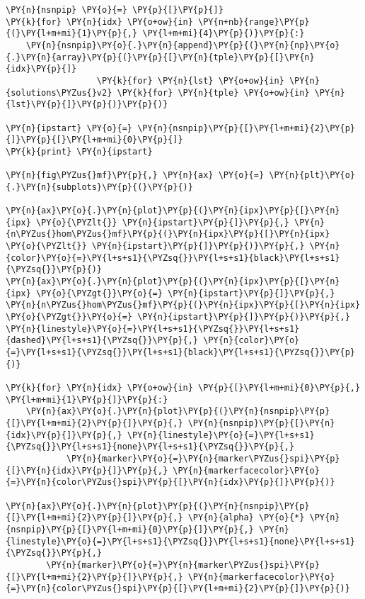 \begin{Verbatim}[commandchars=\\\{\}]
\PY{n}{nsnpip} \PY{o}{=} \PY{p}{[}\PY{p}{]}
\PY{k}{for} \PY{n}{idx} \PY{o+ow}{in} \PY{n+nb}{range}\PY{p}{(}\PY{l+m+mi}{1}\PY{p}{,} \PY{l+m+mi}{4}\PY{p}{)}\PY{p}{:}
    \PY{n}{nsnpip}\PY{o}{.}\PY{n}{append}\PY{p}{(}\PY{n}{np}\PY{o}{.}\PY{n}{array}\PY{p}{(}\PY{p}{[}\PY{n}{tple}\PY{p}{[}\PY{n}{idx}\PY{p}{]}
                  \PY{k}{for} \PY{n}{lst} \PY{o+ow}{in} \PY{n}{solutions\PYZus{}v2} \PY{k}{for} \PY{n}{tple} \PY{o+ow}{in} \PY{n}{lst}\PY{p}{]}\PY{p}{)}\PY{p}{)}

\PY{n}{ipstart} \PY{o}{=} \PY{n}{nsnpip}\PY{p}{[}\PY{l+m+mi}{2}\PY{p}{]}\PY{p}{[}\PY{l+m+mi}{0}\PY{p}{]}
\PY{k}{print} \PY{n}{ipstart}

\PY{n}{fig\PYZus{}mf}\PY{p}{,} \PY{n}{ax} \PY{o}{=} \PY{n}{plt}\PY{o}{.}\PY{n}{subplots}\PY{p}{(}\PY{p}{)}

\PY{n}{ax}\PY{o}{.}\PY{n}{plot}\PY{p}{(}\PY{n}{ipx}\PY{p}{[}\PY{n}{ipx} \PY{o}{\PYZlt{}} \PY{n}{ipstart}\PY{p}{]}\PY{p}{,} \PY{n}{n\PYZus{}hom\PYZus{}mf}\PY{p}{(}\PY{n}{ipx}\PY{p}{[}\PY{n}{ipx} \PY{o}{\PYZlt{}} \PY{n}{ipstart}\PY{p}{]}\PY{p}{)}\PY{p}{,} \PY{n}{color}\PY{o}{=}\PY{l+s+s1}{\PYZsq{}}\PY{l+s+s1}{black}\PY{l+s+s1}{\PYZsq{}}\PY{p}{)}
\PY{n}{ax}\PY{o}{.}\PY{n}{plot}\PY{p}{(}\PY{n}{ipx}\PY{p}{[}\PY{n}{ipx} \PY{o}{\PYZgt{}}\PY{o}{=} \PY{n}{ipstart}\PY{p}{]}\PY{p}{,} \PY{n}{n\PYZus{}hom\PYZus{}mf}\PY{p}{(}\PY{n}{ipx}\PY{p}{[}\PY{n}{ipx} \PY{o}{\PYZgt{}}\PY{o}{=} \PY{n}{ipstart}\PY{p}{]}\PY{p}{)}\PY{p}{,} \PY{n}{linestyle}\PY{o}{=}\PY{l+s+s1}{\PYZsq{}}\PY{l+s+s1}{dashed}\PY{l+s+s1}{\PYZsq{}}\PY{p}{,} \PY{n}{color}\PY{o}{=}\PY{l+s+s1}{\PYZsq{}}\PY{l+s+s1}{black}\PY{l+s+s1}{\PYZsq{}}\PY{p}{)}

\PY{k}{for} \PY{n}{idx} \PY{o+ow}{in} \PY{p}{[}\PY{l+m+mi}{0}\PY{p}{,} \PY{l+m+mi}{1}\PY{p}{]}\PY{p}{:}
    \PY{n}{ax}\PY{o}{.}\PY{n}{plot}\PY{p}{(}\PY{n}{nsnpip}\PY{p}{[}\PY{l+m+mi}{2}\PY{p}{]}\PY{p}{,} \PY{n}{nsnpip}\PY{p}{[}\PY{n}{idx}\PY{p}{]}\PY{p}{,} \PY{n}{linestyle}\PY{o}{=}\PY{l+s+s1}{\PYZsq{}}\PY{l+s+s1}{none}\PY{l+s+s1}{\PYZsq{}}\PY{p}{,}
            \PY{n}{marker}\PY{o}{=}\PY{n}{marker\PYZus{}spi}\PY{p}{[}\PY{n}{idx}\PY{p}{]}\PY{p}{,} \PY{n}{markerfacecolor}\PY{o}{=}\PY{n}{color\PYZus{}spi}\PY{p}{[}\PY{n}{idx}\PY{p}{]}\PY{p}{)}

\PY{n}{ax}\PY{o}{.}\PY{n}{plot}\PY{p}{(}\PY{n}{nsnpip}\PY{p}{[}\PY{l+m+mi}{2}\PY{p}{]}\PY{p}{,} \PY{n}{alpha} \PY{o}{*} \PY{n}{nsnpip}\PY{p}{[}\PY{l+m+mi}{0}\PY{p}{]}\PY{p}{,} \PY{n}{linestyle}\PY{o}{=}\PY{l+s+s1}{\PYZsq{}}\PY{l+s+s1}{none}\PY{l+s+s1}{\PYZsq{}}\PY{p}{,}
        \PY{n}{marker}\PY{o}{=}\PY{n}{marker\PYZus{}spi}\PY{p}{[}\PY{l+m+mi}{2}\PY{p}{]}\PY{p}{,} \PY{n}{markerfacecolor}\PY{o}{=}\PY{n}{color\PYZus{}spi}\PY{p}{[}\PY{l+m+mi}{2}\PY{p}{]}\PY{p}{)}


\end{Verbatim}
